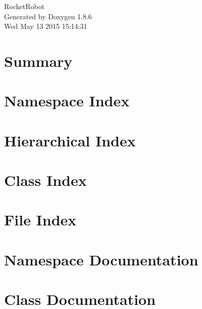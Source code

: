 \documentclass[twoside]{book}
\newcommand{\clearemptydoublepage}{%
  \newpage{\pagestyle{empty}\cleardoublepage}%
}
\begin{document}
\hypersetup{pageanchor=false}
\begin{titlepage}
\vspace*{7cm}
\begin{center}%
{\Large Rocket\-Robot }\\
\vspace*{1cm}
{\large Generated by Doxygen 1.8.6}\\
\vspace*{0.5cm}
{\small Wed May 13 2015 15:14:31}\\
\end{center}
\end{titlepage}
\clearemptydoublepage
\tableofcontents
\clearemptydoublepage
{}
\hypersetup{pageanchor=true}

\chapter{Summary}
\label{index}\hypertarget{index}{}
\chapter{Namespace Index}

\chapter{Hierarchical Index}

\chapter{Class Index}

\chapter{File Index}

\chapter{Namespace Documentation}



\chapter{Class Documentation}



















\end{document}
